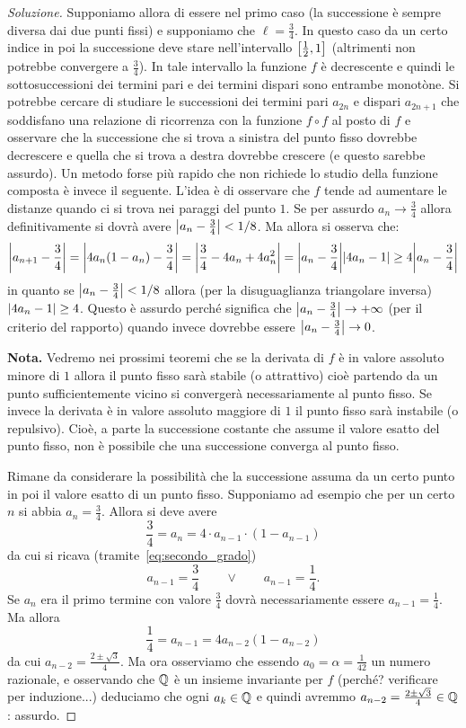 \begin{proof}[Soluzione]
  Supponiamo allora di essere nel primo caso (la successione è sempre
  diversa dai due punti fissi) e supponiamo che $\ell = \frac 3 4$. In
  questo caso da un certo indice in poi la successione deve stare
  nell'intervallo $\left[\frac 1 2,1\right]$ (altrimenti non potrebbe convergere a
  $\frac 3 4$). In tale intervallo la funzione $f$ è decrescente e quindi
  le sottosuccessioni dei termini pari e dei termini dispari sono
  entrambe monotòne. Si potrebbe cercare di studiare le successioni dei
  termini pari $a_{2n}$ e dispari $a_{2n+1}$ che soddisfano una relazione di ricorrenza
  con la funzione $f\circ f$ al posto di $f$ e osservare che la successione
  che si trova a sinistra del punto fisso dovrebbe decrescere e quella che si trova a
  destra dovrebbe crescere (e questo sarebbe assurdo). Un metodo forse più
  rapido che non richiede lo studio della funzione composta è invece il seguente.
  L'idea è di osservare che $f$ tende ad aumentare le distanze quando ci si trova
  nei paraggi del punto $1$. Se per assurdo $a_n\to \frac 3 4$ allora definitivamente
  si dovrà avere ${\left|a_n-\frac 3 4\right|}< 1/8$. Ma allora si osserva che:
  \[
    {\left|a_{n+1}-\frac 3 4\right|}
    = {\left|4a_n(1-a_n)-\frac 3 4\right|}
    = {\left|\frac 3 4 - 4a_n + 4a_n^2\right|}
    = {\left|a_n-\frac 3 4\right|}{\left|4a_n -1\right|}
    \ge 4{\left|a_n-\frac 3 4\right|}
  \]
  in quanto se ${\left|a_n-\frac 3 4\right|}<1/8$ allora (per la disuguaglianza triangolare inversa)
  ${\left|4a_n-1\right|}\ge 4$. Questo è assurdo perché significa che ${\left|a_n -\frac 3 4\right|}\to +\infty$
  (per il criterio del rapporto) quando invece dovrebbe essere ${\left|a_n-\frac 3 4\right|}\to 0$.

  \textbf{Nota.} Vedremo nei prossimi teoremi che
  se la derivata di $f$ è in valore assoluto minore di
  $1$ allora il punto fisso sarà stabile (o attrattivo) cioè partendo
  da un punto sufficientemente vicino si convergerà necessariamente al
  punto fisso. Se invece la derivata è in valore assoluto maggiore di
  $1$ il punto fisso sarà instabile (o repulsivo). Cioè, a parte la
  successione costante che assume il valore esatto del punto fisso,
  non è
  possibile che una successione converga al punto fisso.

  Rimane da considerare la possibilità che la successione assuma da un
  certo punto in poi il valore esatto di un punto fisso. Supponiamo ad
  esempio che per un certo $n$ si abbia $a_n=\frac 3 4$. Allora si deve avere
  \[
  \frac 3 4 = a_n = 4\cdot a_{n-1} \cdot (1-a_{n-1})
  \]
  da cui si ricava (tramite~\eqref{eq:secondo_grado})
  \[
  a_{n-1} = \frac 3 4 
  \qquad\lor\qquad
  a_{n-1} = \frac 1 4.
  \]
  Se $a_n$ era il primo termine con valore $\frac 3 4$ dovrà necessariamente
  essere $a_{n-1} = \frac 1 4$. Ma allora
  \[
  \frac 1 4 = a_{n-1} = 4 a_{n-2}(1-a_{n-2})
  \]
  da cui $a_{n-2} = \frac{2\pm\sqrt 3}{4}$. Ma ora osserviamo che essendo $a_0=
  \alpha = \frac 1 {42}$ un numero razionale, e osservando che ${\mathbb Q}$ è un
  insieme invariante per $f$ (perché? verificare per induzione...)
  deduciamo che ogni $a_k \in {\mathbb Q}$ e quindi
  avremmo $a_{n-2} = \frac{2\pm\sqrt 3}{4} \in {\mathbb Q}$: assurdo.


\end{proof}
